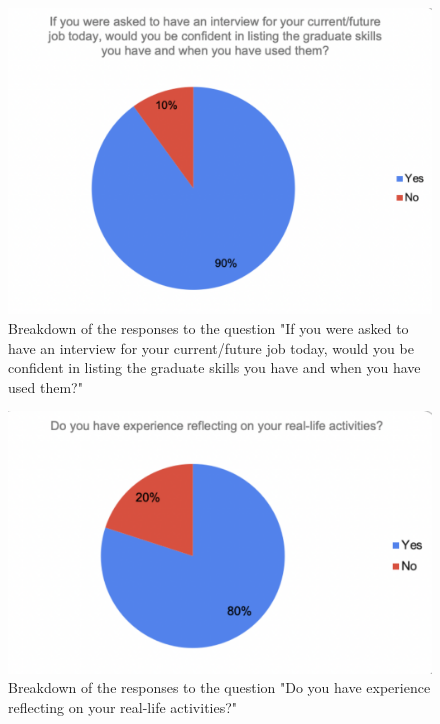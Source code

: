 \documentclass{l4proj}
\begin{document}
\begin{appendices}
\begin{figure}[H]
    \begin{centering}
    \includegraphics[scale=0.5]{images/GradAttr-3.pdf}
    \caption{Breakdown of the responses to the question "If you were asked to have an interview for your current/future job today, would you be confident in listing the graduate skills you have and when you have used them?"}
    \label{fig: GradAttr-3}
    \end{centering}
\end{figure}

\begin{figure}[H]
    \begin{centering}
    \includegraphics[scale=0.5]{images/GradAttr-4.pdf}
    \caption{Breakdown of the responses to the question "Do you have experience reflecting on your real-life activities?"}
    \label{fig: GradAttr-4}
    \end{centering}
\end{figure}


\end{appendices}
\end{document}
